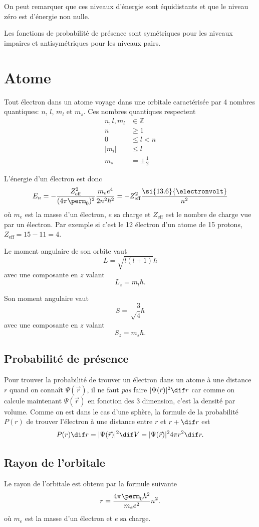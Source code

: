 On peut remarquer que ces niveaux d'énergie sont équidistants et que
le niveau zéro est d'énergie non nulle.

Les fonctions de probabilité de présence sont symétriques pour les
niveaux impaires et antisymétriques pour les niveaux pairs.

\section{Atome}
Tout électron dans un atome voyage dans une orbitale caractérisée par
4 nombres quantiques: $n$, $l$, $m_l$ et $m_s$.
Ces nombres quantiques respectent
\begin{align*}
  n, l, m_l & \in \mathbb{Z}\\
  n & \geq 1\\
  0 & \leq l < n\\
  |m_l| & \leq l\\
  m_s & = \pm \frac12
\end{align*}

L'énergie d'un électron est donc
\[ E_n = -\frac{Z_\mathrm{eff}^2}{(4\pi\perm_0)^2}\frac{m_ee^4}{2n^2\hbar^2}
= -Z_\mathrm{eff}^2\frac{\si{13.6}{\electronvolt}}{n^2} \]
où $m_e$ est la masse d'un électron, $e$ sa charge et
$Z_\mathrm{eff}$ est le nombre de charge vue par un électron.
Par exemple si c'est le 12\ieme{} électron d'un atome de 15 protons,
$Z_\mathrm{eff} = 15 - 11 = 4$.

Le moment angulaire de son orbite vaut
\[ L = \sqrt{l(l+1)} \hbar \]
avec une composante en $z$ valant
\[ L_z = m_l \hbar. \]

Son moment angulaire vaut
\[ S = \sqrt\frac34 \hbar \]
avec une composante en $z$ valant
\[ S_z = m_s \hbar. \]

\subsection{Probabilité de présence}
Pour trouver la probabilité de trouver un électron dans un atome
à une distance $r$ quand on connaît $\Psi(\vec{r})$,
il ne faut \emph{pas} faire $|\Psi(\vec{r})|^2 \dif r$
car comme on calcule maintenant $\Psi(\vec{r})$ en fonction des 3 dimension,
c'est la densité par volume.
Comme on est dans le cas d'une sphère, la formule de la probabilité
$P(r)$ de trouver l'électron à une distance entre $r$ et $r+\dif r$ est
\[ P(r) \dif r = |\Psi(\vec{r})|^2 \dif V
= |\Psi(\vec{r})|^2 4\pi r^2 \dif r. \]

\subsection{Rayon de l'orbitale}
Le rayon de l'orbitale est obtenu par la formule suivante
\[ r = \frac{4\pi\perm_0\hbar^2}{m_ee^2}n^2. \]
où $m_e$ est la masse d'un électron et $e$ sa charge.

